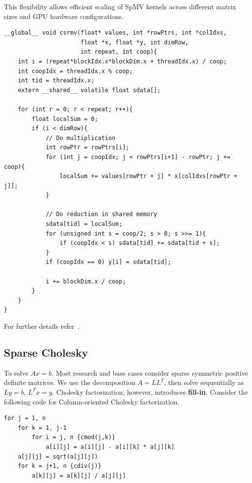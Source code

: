 \documentclass[12pt]{book}
\begin{document}
This flexibility allows efficient scaling of SpMV kernels across different matrix sizes and GPU hardware configurations.

\begin{lstlisting}[style=cppstyle]
__global__ void csrmv(float* values, int *rowPtrs, int *colIdxs, 
                      float *x, float *y, int dimRow, 
                      int repeat, int coop){
    int i = (repeat*blockIdx.x*blockDim.x + threadIdx.x) / coop;
    int coopIdx = threadIdx.x % coop;
    int tid = threadIdx.x;
    extern __shared__ volatile float sdata[];

    for (int r = 0; r < repeat; r++){
        float localSum = 0;
        if (i < dimRow){
            // Do multiplication
            int rowPtr = rowPtrs[i];
            for (int j = coopIdx; j < rowPtrs[i+1] - rowPtr; j += coop){
                localSum += values[rowPtr + j] * x[colIdxs[rowPtr + j]];
            }

            // Do reduction in shared memory
            sdata[tid] = localSum;
            for (unsigned int s = coop/2; s > 0; s >>= 1){
                if (coopIdx < s) sdata[tid] += sdata[tid + s];
            }
            if (coopIdx == 0) y[i] = sdata[tid];

            i += blockDim.x / coop;
        }
    }
}
\end{lstlisting}

For further details refer~\cite{giles2012efficient}.

\subsection{Sparse Cholesky}
To solve $Ax = b$. Most research and base cases consider sparse symmetric positive definite matrices.  
We use the decomposition $A = LL^T$, then solve sequentially as $Ly = b$, $L^Tx = y$.  
Cholesky factorization, however, introduces \textbf{fill-in}. Consider the following code for Column-oriented Cholesky factorization.

\begin{lstlisting}[style=cppstyle]
for j = 1, n
    for k = 1, j-1
        for i = j, n {cmod(j,k)}
            a[i][j] = a[i][j] - a[i][k] * a[j][k]
    a[j][j] = sqrt(a[j][j])
    for k = j+1, n {cdiv(j)}
        a[k][j] = a[k][j] / a[j][j]
\end{lstlisting}
\end{document}
